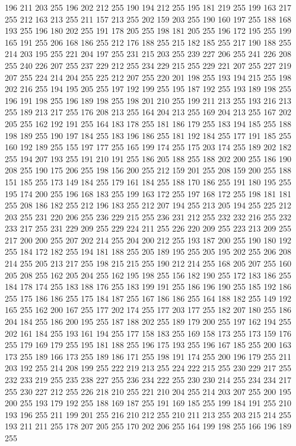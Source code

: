 196 211 203 255 196 202 212 255 190 194 212 255 195 181 219 255 199 163 217 255 212 163 213 255 211 157 213 255 202 159 203 255 190 160 197 255 188 168 193 255 196 180 202 255 191 178 205 255 198 181 205 255 196 172 195 255 199 165 191 255 206 168 186 255
212 176 188 255 215 182 185 255 217 190 188 255 214 203 195 255 221 204 197 255 231 215 203 255 239 227 206 255 241 226 208 255 240 226 207 255 237 229 212 255 234 229 215 255 229 221 207 255 227 219 207 255 224 214 204 255 225 212 207 255 220 201 198 255
193 194 215 255 198 202 216 255 194 195 205 255 197 192 199 255 195 187 192 255 193 189 198 255 196 191 198 255 196 189 198 255 198 201 210 255 199 211 213 255 193 216 213 255 189 213 217 255 176 208 213 255 164 204 213 255 169 204 213 255 167 202 205 255
162 192 191 255 164 183 178 255 181 186 179 255 183 194 185 255 188 198 189 255 190 197 184 255 183 196 186 255 181 192 184 255 177 191 185 255 160 192 189 255 155 197 177 255 165 199 174 255 175 203 174 255 189 202 182 255 194 207 193 255 191 210 191 255
186 205 188 255 188 202 200 255 186 190 208 255 190 175 206 255 198 156 200 255 212 159 201 255 208 159 200 255 188 151 185 255 173 149 184 255 179 161 184 255 188 170 186 255 191 180 195 255 195 174 200 255 196 168 183 255 199 163 172 255 197 168 172 255
198 181 181 255 208 186 182 255 212 196 183 255 212 207 194 255 213 205 194 255 225 212 203 255 231 220 206 255 236 229 215 255 236 231 212 255 232 232 216 255 232 233 217 255 231 229 209 255 229 224 211 255 226 220 209 255 223 213 209 255 217 200 200 255
207 202 214 255 204 200 212 255 193 187 200 255 190 180 192 255 184 172 182 255 194 181 188 255 205 189 195 255 205 195 202 255 206 208 214 255 205 213 217 255 198 215 215 255 190 212 214 255 168 205 207 255 160 205 208 255 162 205 204 255 162 195 198 255
156 182 190 255 172 183 186 255 184 178 174 255 183 188 176 255 183 199 191 255 186 196 190 255 185 192 186 255 175 186 186 255 175 184 187 255 167 186 186 255 164 188 182 255 149 192 165 255 162 200 167 255 177 202 174 255 177 203 177 255 182 207 180 255
186 204 184 255 186 200 195 255 187 188 202 255 189 179 200 255 197 162 194 255 202 161 184 255 193 161 194 255 177 158 183 255 169 158 173 255 173 159 176 255 179 169 179 255 195 181 188 255 196 175 193 255 196 167 185 255 200 163 173 255 189 166 173 255
189 186 171 255 198 191 174 255 200 196 179 255 211 203 192 255 214 208 199 255 222 219 213 255 224 222 215 255 230 229 217 255 232 233 219 255 235 238 227 255 236 234 222 255 230 230 214 255 234 234 217 255 230 227 212 255 226 218 210 255 221 210 204 255
214 203 207 255 200 195 200 255 193 179 192 255 188 169 187 255 191 169 185 255 199 184 191 255 210 193 196 255 211 199 201 255 216 210 212 255 210 211 213 255 203 215 214 255 193 211 211 255 178 207 205 255 170 202 206 255 164 199 198 255 166 196 189 255
